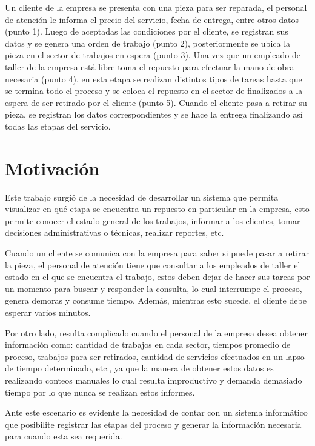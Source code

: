 Un cliente de la empresa se presenta con una pieza para ser reparada, el personal de atención le informa el precio del servicio, fecha de entrega, entre otros datos (punto 1). Luego de aceptadas las condiciones por el cliente, se registran sus datos y se genera una orden de trabajo (punto 2), posteriormente se ubica la pieza en el sector de trabajos en espera (punto 3). Una vez que un empleado de taller de la empresa está libre toma el repuesto para efectuar la mano de obra necesaria (punto 4), en esta etapa se realizan distintos tipos de tareas hasta que se termina todo el proceso y se coloca el repuesto en el sector de finalizados a la espera de ser retirado por el cliente (punto 5). Cuando el cliente pasa a retirar su pieza, se registran los datos correspondientes y se hace la entrega finalizando así todas las etapas del servicio.


\section{Motivación}

Este trabajo surgió de la necesidad de desarrollar un sistema que permita visualizar en qué etapa se encuentra un repuesto en particular en la empresa, esto permite conocer el estado general de los trabajos, informar a los clientes, tomar decisiones administrativas o técnicas, realizar reportes, etc. 

Cuando un cliente se comunica con la empresa para saber si puede pasar a retirar la pieza, el personal de atención tiene que consultar a los empleados de taller el estado en el que se encuentra el trabajo, estos deben dejar de hacer sus tareas por un momento para buscar y responder la consulta, lo cual interrumpe el proceso, genera demoras y consume tiempo. Además, mientras esto sucede, el cliente debe esperar varios minutos. 

Por otro lado, resulta complicado cuando el personal de la empresa desea obtener información como: cantidad de trabajos en cada sector, tiempos promedio de proceso, trabajos para ser retirados, cantidad de servicios efectuados en un lapso de tiempo determinado, etc., ya que la manera de obtener estos datos es realizando conteos manuales lo cual resulta improductivo y demanda demasiado tiempo por lo que nunca se realizan estos informes.

Ante este escenario es evidente la necesidad de contar con un sistema informático que posibilite registrar las etapas del proceso y generar la información necesaria para cuando esta sea requerida.

